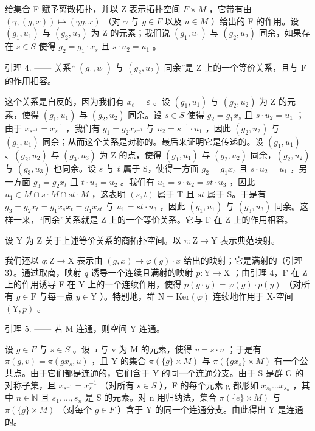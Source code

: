 给集合 F 赋予离散拓扑，并以 Z 表示拓扑空间 \(F \times M\) ，它带有由 \((\gamma, (g, x)) \mapsto (\gamma g, x)\) （对 \(\gamma\) 与 \(g \in F\) 以及 \(u \in M\) ）给出的 F 的作用。设 \((g_{1}, u_{1})\) 与 \((g_{2}, u_{2})\) 为 Z 的元素；我们说 \((g_{1}, u_{1})\) 与 \((g_{2}, u_{2})\) 同余，如果存在 \(s \in S\) 使得 \(g_{2} = g_{1} \cdot x_{s}\) 且 \(s \cdot u_{2} = u_{1}\) 。

引理 4. —— 关系“ \((g_{1}, u_{1})\) 与 \((g_{2}, u_{2})\) 同余”是 Z 上的一个等价关系，且与 F 的作用相容。

这个关系是自反的，因为我们有 \(x_e = \varepsilon\) 。设 \((g_1, u_1)\) 与 \((g_2, u_2)\) 为 Z 的元素，使得 \((g_1, u_1)\) 与 \((g_2, u_2)\) 同余。设 \(s \in S\) 使得 \(g_2 = g_1 x_s\) 且 \(s \cdot u_2 = u_1\) ；由于 \(x_{s^{-1}} = x_s^{-1}\) ，我们有 \(g_1 = g_2 x_{s^{-1}}\) 与 \(u_2 = s^{-1} \cdot u_1\) ，因此 \((g_2, u_2)\) 与 \((g_1, u_1)\) 同余；从而这个关系是对称的。最后来证明它是传递的。设 \((g_1, u_1)\) 、\((g_2, u_2)\) 与 \((g_3, u_3)\) 为 Z 的点，使得 \((g_1, u_1)\) 与 \((g_2, u_2)\) 同余，\((g_2, u_2)\) 与 \((g_3, u_3)\) 也同余。设 \(s\) 与 \(t\) 属于 S，使得一方面 \(g_2 = g_1 x_s\) 且 \(s \cdot u_2 = u_1\) ，另一方面 \(g_3 = g_2 x_t\) 且 \(t \cdot u_3 = u_2\) 。我们有 \(u_1 = s \cdot u_2 = st \cdot u_3\) ，因此 \(u_1 \in M \cap s \cdot M \cap st \cdot M\) ，这表明 \((s, t)\) 属于 T 且 \(st\) 属于 S。于是有 \(g_3 = g_2 x_t = g_1 x_s x_t = g_1 x_{st}\) 与 \(u_1 = st \cdot u_3\) ，因此 \((g_1, u_1)\) 与 \((g_3, u_3)\) 同余。这样一来，“同余”关系就是 Z 上的一个等价关系。它与 F 在 Z 上的作用相容。

设 Y 为 Z 关于上述等价关系的商拓扑空间。以 \(\pi\colon\mathrm{Z}\to\mathrm{Y}\) 表示典范映射。

我们还以 \(q \colon \mathrm{Z} \to \mathrm{X}\) 表示由 \((g, x) \mapsto \varphi(g) \cdot x\) 给出的映射；它是满射的（引理 3）。通过取商，映射 \(q\) 诱导一个连续且满射的映射 \(p \colon \mathrm{Y} \to \mathrm{X}\) ；由引理 4，F 在 Z 上的作用诱导 F 在 Y 上的一个连续作用，使得 \(p(g \cdot y) = \varphi(g) \cdot p(y)\) （对所有 \(g \in \mathrm{F}\) 与每一点 \(y \in \mathrm{Y}\) ）。特别地，群 \(\mathrm{N} = \mathrm{Ker}(\varphi)\) 连续地作用于 X-空间 \((\mathrm{Y}, p)\) 。

引理 5. —— 若 M 连通，则空间 Y 连通。

设 \(g \in F\) 与 \(s \in S\) 。设 u 与 v 为 M 的元素，使得 \(v = s \cdot u\) ；于是有 \(\pi(g, v) = \pi(gx_s, u)\) ，且 Y 的集合 \(\pi(\{g\} \times M)\) 与 \(\pi(\{gx_s\} \times M)\) 有一个公共点。由于它们都是连通的，它们含于 Y 的同一个连通分支。由于 S 是群 G 的对称子集，且 \(x_{s^{-1}} = x_s^{-1}\) （对所有 \(s \in S\) ），F 的每个元素 g 都形如 \(x_{s_1} \ldots x_{s_n}\) ，其中 \(n \in \mathbb{N}\) 且 \(s_1, \ldots, s_n\) 是 S 的元素。对 n 用归纳法，集合 \(\pi(\{e\} \times M)\) 与 \(\pi(\{g\} \times M)\) （对每个 \(g \in F\) ）含于 Y 的同一个连通分支。由此得出 Y 是连通的。

